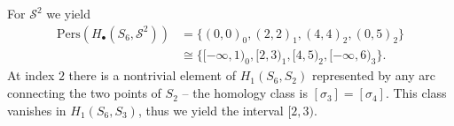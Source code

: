 \begin{example}
	For $\mathcal{S}^{2}$ we yield
	\begin{align}
		\mathrm{Pers}(H_{\bullet}(S_{6},\mathcal{S}^{2})) & = \{(0,0)_{0}, (2,2)_{1}, (4,4)_{2}, (0,5)_{2}\}               \\
		                                                  & \cong \{[-\infty, 1)_{0}, [2,3)_{1}, [4,5)_{2}, [-\infty,6)_{3}\}.
	\end{align}
	At index $2$ there is a nontrivial element of $H_{1}(S_{6},S_{2})$ represented
	by any arc connecting the two points of $S_{2}$ \cite[\S 2.4, Example]{de2011dualities} --
	the homology class is $[\sigma_{3}] = [\sigma_{4}]$. This class vanishes in $H_{1}(S_{6},S_{3})$, thus we yield the interval $[2,3)$.
\end{example}


